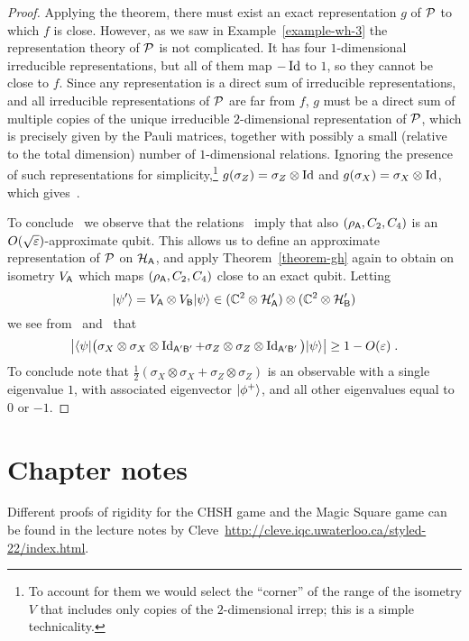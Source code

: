 \begin{proof}
Applying the theorem, there must exist an exact representation $g$ of $\mathcal{P}$ to which $f$ is close. However, as we saw in Example~\ref{example-wh-3} the representation theory of $\mathcal{P}$ is not complicated. It has four $1$-dimensional irreducible representations, but all of them map $-\mathop{\rm Id}\nolimits$ to $1$, so they cannot be close to $f$. Since any representation is a direct sum of irreducible representations, and all irreducible representations of $\mathcal{P}$ are far from $f$, $g$ must be a direct sum of multiple copies of the unique irreducible $2$-dimensional representation of $\mathcal{P}$, which is precisely given by the Pauli matrices, together with possibly a small (relative to the total dimension) number of $1$-dimensional relations. Ignoring the presence of such representations for simplicity,\footnote{To account for them we would select the ``corner'' of the range of the isometry $V$ that includes only copies of the $2$-dimensional irrep; this is a simple technicality.} $g(\sigma_Z) = \sigma_Z \otimes \mathop{\rm Id}\nolimits$ and $g(\sigma_X) = \sigma_X \otimes \mathop{\rm Id}\nolimits$, which gives~. 

To conclude~ we observe that the relations~ imply that also $(\rho_{\textsf{A}},C_2,C_4)$ is an $O(\sqrt{\varepsilon})$-approximate qubit. This allows us to define an approximate representation of $\mathcal{P}$ on $\mathcal{H}_{\textsf{A}}$, and apply Theorem~\ref{theorem-gh} again to obtain on isometry $V_{\textsf{A}}$ which maps $(\rho_{\textsf{A}},C_2,C_4)$ close to an exact qubit. Letting 
\[ |\psi'\rangle = V_{\textsf{A}} \otimes V_{\textsf{B}} |\psi\rangle \in (\mathbb{C}^2 \otimes \mathcal{H}_{\textsf{A}}')\otimes (\mathbb{C}^2 \otimes \mathcal{H}_{\textsf{B}}') \]
we see from~ and~ that 
\[\big| \langle\psi| \big(\sigma_X \otimes \sigma_X \otimes \mathop{\rm Id}\nolimits_{{\textsf{A}}'{\textsf{B}}'} + \sigma_Z \otimes \sigma_Z \otimes \mathop{\rm Id}\nolimits_{{\textsf{A}}'{\textsf{B}}'} \big) |\psi\rangle\big| \geq 1-O({\varepsilon})\;.\]
To conclude note that $\frac{1}{2}(\sigma_X \otimes \sigma_X + \sigma_Z \otimes \sigma_Z )$ is an observable with a single eigenvalue $1$, with associated eigenvector $|\phi^+\rangle$, and all other eigenvalues equal to $0$ or $-1$. 
\end{proof}


\section{Chapter notes}
\label{section-rigidity-notes}

Different proofs of rigidity for the CHSH game and the Magic Square game can be found in the lecture notes by Cleve~\url{http://cleve.iqc.uwaterloo.ca/styled-22/index.html}. 








